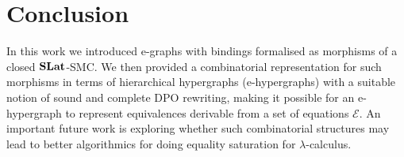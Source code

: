 \section{Conclusion}
In this work we introduced e-graphs with bindings formalised as morphisms of a closed $\mathbf{SLat}$-SMC.
We then provided a combinatorial representation for such morphisms in terms of hierarchical hypergraphs (e-hypergraphs) with a suitable notion of sound and complete DPO rewriting, making it possible for an e-hypergraph to represent equivalences derivable from a set of equations $\mathcal{E}$.
An important future work is exploring whether such combinatorial structures may lead to better algorithmics for doing equality saturation for $\lambda$-calculus.
